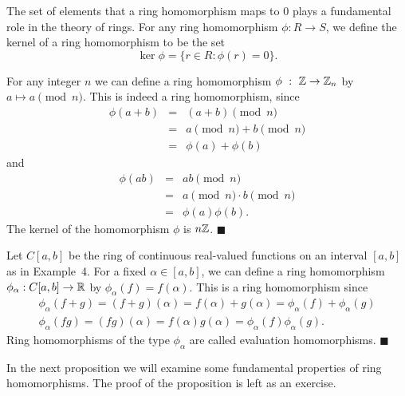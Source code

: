  
The set of elements that a ring homomorphism maps to $0$ plays a
fundamental role in the theory of rings. For any ring homomorphism
$\phi : R \rightarrow S$, we define the {\bfi
kernel\/} of a ring homomorphism to be the set
\[
\ker \phi = \{ r \in R : \phi( r ) = 0 \}.
\]
 
 
\vspace{2ex}
 
 
For any integer $n$ we can define a ring homomorphism $\phi~:~{\Bbb Z}
\rightarrow {\Bbb Z}_n$ by $a \mapsto a \pmod{n}$. This is indeed a
ring homomorphism, since 
\begin{eqnarray*}
\phi( a + b )  & = & (a + b) \pmod{n} \\
 & = &  a \pmod{n} + b \pmod{n}\\
 & = & \phi( a ) + \phi(b)
\end{eqnarray*}
and
\begin{eqnarray*}
\phi( a b )  & = &  ab \pmod{n} \\
 & = & a \pmod{n}\cdot  b \pmod{n} \\
 & = & \phi( a ) \phi(b).
\end{eqnarray*}
The kernel of the homomorphism $\phi$ is $n {\Bbb Z}$.
\hspace{\fill} $\blacksquare$
 
 
\vspace{2ex}
 
 
Let $C[a, b]$ be the ring of continuous real-valued functions on an
interval $[a,b]$ as in Example~4. For a fixed  $\alpha \in [a, b]$,
we can define a ring homomorphism $\phi_{\alpha} : C[a, b] \rightarrow
{\Bbb R}$ by $\phi_{\alpha} (f ) = f( \alpha)$. This  is a ring
homomorphism since 
\[
\begin{array}{c}
\phi_{\alpha}( f + g )  = (f + g)( \alpha) = f(\alpha) + g(\alpha) =
\phi_{\alpha}( f ) + \phi_{\alpha}(g ) \\
\phi_{\alpha}( f  g )  = (f  g)( \alpha) = f(\alpha)  g(\alpha) =
\phi_{\alpha}( f )  \phi_{\alpha}(g ).
\end{array}
\]
Ring homomorphisms of the type $\phi_{\alpha}$ are called {\bfi
evaluation homomorphisms}.
\hspace{\fill} $\blacksquare$
 
 
\vspace{2ex}
 
 
In the next proposition we will examine some fundamental properties
of ring homomorphisms. The proof of the proposition is left as an
exercise.
 
